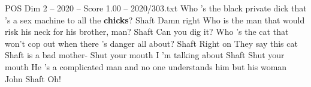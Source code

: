 \begin{textsample}{POS Dim 2 – 2020 – Score 1.00 – 2020/303.txt}  \label{ex:f2_pos_025}
Who 's the black private dick that 's a sex machine to all the \textbf{chicks}?
Shaft Damn right Who is the man that would risk his neck for his brother, man?
Shaft Can you dig it?
Who 's the cat that won't cop out when there 's danger all about?
Shaft Right on They say this cat Shaft is a bad mother- Shut your mouth I 'm talking about Shaft Shut your mouth He 's a complicated man and no one understands him but his woman John Shaft Oh!

\end{textsample}
